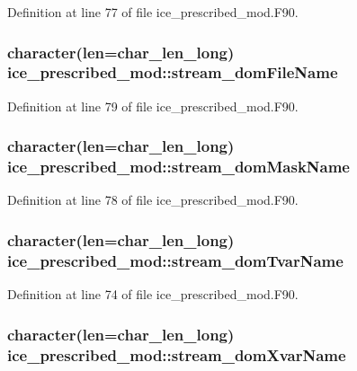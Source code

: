Definition at line 77 of file ice\_\-prescribed\_\-mod.F90.\hypertarget{namespaceice__prescribed__mod_a54b8dea8c8a1cdca57b336d8dedeb51c}{
\subsubsection[{stream\_\-domFileName}]{\setlength{\rightskip}{0pt plus 5cm}character(len=char\_\-len\_\-long) {\bf ice\_\-prescribed\_\-mod::stream\_\-domFileName}}}
\label{namespaceice__prescribed__mod_a54b8dea8c8a1cdca57b336d8dedeb51c}


Definition at line 79 of file ice\_\-prescribed\_\-mod.F90.\hypertarget{namespaceice__prescribed__mod_afe7ec341a14bd719d0759586a729e76d}{
\subsubsection[{stream\_\-domMaskName}]{\setlength{\rightskip}{0pt plus 5cm}character(len=char\_\-len\_\-long) {\bf ice\_\-prescribed\_\-mod::stream\_\-domMaskName}}}
\label{namespaceice__prescribed__mod_afe7ec341a14bd719d0759586a729e76d}


Definition at line 78 of file ice\_\-prescribed\_\-mod.F90.\hypertarget{namespaceice__prescribed__mod_abae176465bd6efc8cb114772aa63b145}{
\subsubsection[{stream\_\-domTvarName}]{\setlength{\rightskip}{0pt plus 5cm}character(len=char\_\-len\_\-long) {\bf ice\_\-prescribed\_\-mod::stream\_\-domTvarName}}}
\label{namespaceice__prescribed__mod_abae176465bd6efc8cb114772aa63b145}


Definition at line 74 of file ice\_\-prescribed\_\-mod.F90.\hypertarget{namespaceice__prescribed__mod_ae6a726ada1e1e93644fa269052a767e4}{
\subsubsection[{stream\_\-domXvarName}]{\setlength{\rightskip}{0pt plus 5cm}character(len=char\_\-len\_\-long) {\bf ice\_\-prescribed\_\-mod::stream\_\-domXvarName}}}
\label{namespaceice__prescribed__mod_ae6a726ada1e1e93644fa269052a767e4}


